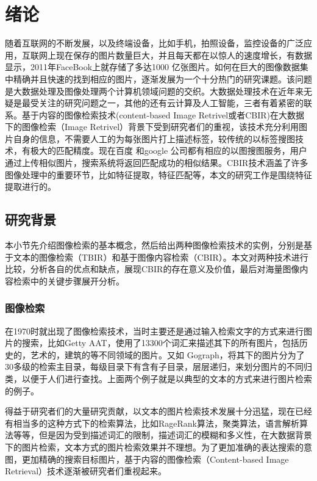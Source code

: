 ﻿\chapter{绪论}

随着互联网的不断发展，以及终端设备，比如手机，拍照设备，监控设备的广泛应用，互联网上现在保存的图片数量巨大，并且每天都在以惊人的速度增长，有数据显示，2011年FaceBook上就存储了多达1000 亿张图片。如何在巨大的图像数据集中精确并且快速的找到相应的图片，逐渐发展为一个十分热门的研究课题。该问题是大数据处理及图像处理两个计算机领域问题的交织。大数据处理技术在近年来无疑是最受关注的研究问题之一，其他的还有云计算及人工智能，三者有着紧密的联系。基于内容的图像检索技术(content-based Image Retrivel或者CBIR)在大数据下的图像检索（Image Retrivel）背景下受到研究者们的重视，该技术充分利用图片自身的信息，不需要人工的为每张图片打上描述标签，较传统的以标签搜图技术，有极大的匹配精度。现在百度 和google 公司都有相应的以图搜图服务，用户通过上传相似图片，搜索系统将返回匹配成功的相似结果。CBIR技术涵盖了许多图像处理中的重要环节，比如特征提取，特征匹配等，本文的研究工作是围绕特征提取进行的。

\section{研究背景}
本小节先介绍图像检索的基本概念，然后给出两种图像检索技术的实例，分别是基于文本的图像检索（TBIR）和基于图像内容检索（CBIR）。本文对两种技术进行比较，分析各自的优点和缺点，展现CBIR的存在意义及价值，最后对海量图像内容检索中的关键步骤展开分析。

\subsection{图像检索}
在1970时就出现了图像检索技术，当时主要还是通过输入检索文字的方式来进行图片的搜索，比如Getty AAT，使用了13300个词汇来描述其下的所有图片，包括历史的，艺术的，建筑的等不同领域的图片。又如 Gograph，将其下的图片分为了30多级的检索主目录，每级目录下有含有子目录，层层递归，来划分图片的不同归类，以便于人们进行查找。上面两个例子就是以典型的文本的方式来进行图片检索的例子。

得益于研究者们的大量研究贡献，以文本的图片检索技术发展十分迅猛，现在已经有相当多的这种方式下的检索算法，比如RageRank算法，聚类算法，语言解析算法等等，但是因为受到描述词汇的限制，描述词汇的模糊和多义性，在大数据背景下的图片检索，文本方式的图片检索效果并不理想。为了更加准确的表达搜索的意图，更加精确的搜索目标图片，基于内容的图像检索（Content-based Image Retrieval）技术逐渐被研究者们重视起来。

